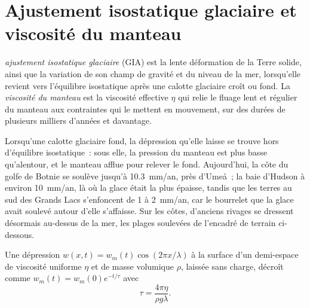 \section{Ajustement isostatique glaciaire et viscosité du manteau}\label{sec:b3:mantle-convection:gia}

\begin{definition}\label{def:b3:mantle-convection:gia}
\emph{ajustement isostatique glaciaire} (GIA)
est la lente déformation de la Terre solide, ainsi que la variation de son champ
de gravité et du niveau de la mer, lorsqu'elle revient vers l'équilibre isostatique après une
calotte glaciaire croît ou fond. La \emph{viscosité du manteau}
est la viscosité effective $\eta$ qui relie le fluage lent et régulier du
manteau aux contraintes qui le mettent en mouvement, sur des durées de plusieurs milliers d'années et davantage.
\end{definition}

Lorsqu'une calotte glaciaire fond, la dépression qu'elle laisse se trouve hors
d'équilibre isostatique~: sous elle, la pression du manteau est plus basse qu'alentour, et
le manteau afflue pour relever le fond. Aujourd'hui, la côte du golfe de Botnie
se soulève jusqu'à \qty{10.3}{mm/an}, près d'Umeå~; la baie d'Hudson à environ
\qty{10}{mm/an}, là où la glace était la plus épaisse, tandis que les terres au sud des Grands
Lacs s'enfoncent de 1 à \qty{2}{mm/an}, car le bourrelet que la glace avait soulevé
autour d'elle s'affaisse. Sur les côtes, d'anciens rivages se dressent désormais au-dessus de la mer, les
plages soulevées de l'encadré de terrain ci-dessous.

\begin{theorem}\label{thm:b3:mantle-convection:relaxation}
Une dépression $w(x, t) = w_m(t)\cos(2\pi x/\lambda)$ à la surface
d'un demi-espace de viscosité uniforme $\eta$ et de masse volumique $\rho$, laissée sans charge,
décroît comme $w_m(t) = w_m(0)e^{-t/\tau}$ avec
\[
  \tau = \frac{4\pi\eta}{\rho g\lambda} .
\]
\end{theorem}

